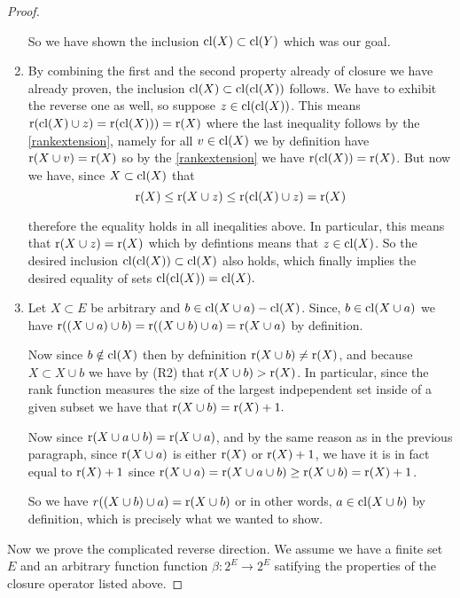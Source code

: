 \begin{proof}
\begin{enumerate}
        So we have shown the inclusion $\mathrm{cl}(X) \subset \mathrm{cl}(Y)$ which was our goal.

        \item By combining the first and the second property already of closure we have already proven, the inclusion $\mathrm{cl}(X) \subset \mathrm{cl}(\mathrm{cl}(X))$  follows. We have to exhibit the reverse one as well, so suppose $z\in \mathrm{cl}(\mathrm{cl}(X))$. This means $\text{r}(\mathrm{cl}(X) \cup z)= \text{r}(\mathrm{cl}(X))) = \text{r}(X)$ where the last inequality follows by the \ref{rankextension}, namely for all $v \in \mathrm{cl}(X)$ we by definition have $\text{r}(X \cup v) = \text{r}(X)$ so by the \ref{rankextension} we have $\text{r}(\mathrm{cl}(X)) = \text{r}(X)$. But now we have, since $X \subset \mathrm{cl}(X)$ that $$\text{r}(X) \leq \text{r}(X \cup z) \leq \text{r}(\mathrm{cl}(X)\cup z) = \text{r}(X)$$

       therefore the equality holds in all ineqalities above. In particular, this means that $\text{r}(X \cup z) = \text{r}(X)$ which by defintions means that $z \in \mathrm{cl}(X)$. So the desired inclusion $ \mathrm{cl}(\mathrm{cl}(X))\subset \mathrm{cl}(X)$ also holds, which finally implies the desired equality of sets $\mathrm{cl}(\mathrm{cl}(X))= \mathrm{cl}(X).$

        \item Let $X \subset E$ be arbitrary and $b \in \mathrm{cl}(X \cup a) - \mathrm{cl}(X)$. Since, $b \in \mathrm{cl}(X \cup a)$ we have $\text{r}((X\cup a)\cup b) = \text{r}((X\cup b) \cup a) = \text{r}(X \cup a)$ by definition. 

        Now since $b \notin \mathrm{cl}(X)$ then by defninition $\text{r}(X \cup b)\neq \text{r}(X)$, and because $X \subset X \cup b$ we have by (R2) that $\text{r}(X \cup b) > \text{r}(X)$. In particular, since the rank function measures the size of the largest indpependent set inside of a given subset we have that $\text{r}(X \cup b) = \text{r}(X)+1.$ 

        Now since $\text{r}(X \cup a \cup b) = \text{r}(X \cup a)$, and by the same reason as in the previous paragraph, since $\text{r}(X \cup a)$ is either $\text{r}(X)$ or $\text{r}(X) + 1$, we have it is in fact equal to $\text{r}(X) + 1$ since $\text{r}(X \cup a) = \text{r}(X \cup a \cup b) \geq \text{r}(X \cup b)= \text{r}(X) + 1$.

        So we have $r((X\cup b) \cup a) = \text{r}(X \cup b)$ or in other words, $a \in \mathrm{cl}(X \cup b)$ by definition, which is precisely what we wanted to show.
       
        \end{enumerate}



    Now we prove the complicated reverse direction. We assume we have a finite set $E$ and an arbitrary function function $\beta : 2^E \to 2^E$ satifying the properties of the closure operator listed above.


\end{proof}
